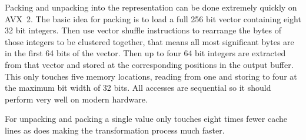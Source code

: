 Packing and unpacking into the \bs{} representation can be done extremely
quickly on AVX~2. The basic idea for packing is to load a full 256 bit vector
containing eight 32 bit integers. Then use vector shuffle instructions to
rearrange the bytes of those integers to be clustered together, that means all
most significant bytes are in the first 64 bits of the vector. Then up to four
64 bit integers are extracted from that vector and stored at the corresponding
positions in the output buffer. This only touches five memory locations, reading
from one and storing to four at the maximum bit width of 32 bits. All accesses
are sequential so it should perform very well on modern hardware.

For \bs{} unpacking and packing a single value only touches eight times fewer
cache lines as \bwv{} does making the transformation process much faster.
